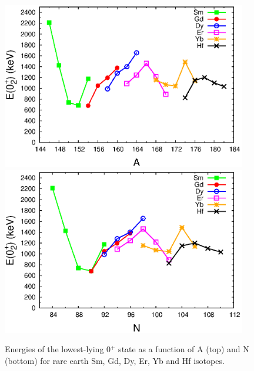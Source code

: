 \begin{figure}[h!]
\begin{center}
\includegraphics[width=0.95\textwidth]{figures/Rare_Earth_0s_energies.eps}\\
\includegraphics[width=0.95\textwidth]{figures/Rare_Earth_0s_N.eps}\\
\end{center}
\caption{Energies of the lowest-lying 0$^+$ state as a function of A (top) and N (bottom) for rare earth Sm, Gd, Dy, Er, Yb and Hf isotopes. \label{fig:Rare_earth_E02}}
\end{figure}

